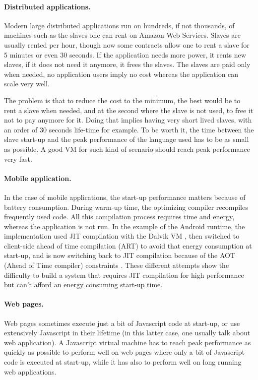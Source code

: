 \documentclass[a4paper,12pt,twoside]{../includes/ThesisStyle}
\begin{document}
\paragraph{Distributed applications.}
Modern large distributed applications run on hundreds, if not thousands, of machines such as the slaves one can rent on Amazon Web Services. Slaves are usually rented per hour, though now some contracts allow one to rent a slave for 5 minutes or even 30 seconds. If the application needs more power, it rents new slaves, if it does not need it anymore, it frees the slaves. The slaves are paid only when needed, no application users imply no cost whereas the application can scale very well.

The problem is that to reduce the cost to the minimum, the best would be to rent a slave when needed, and at the second where the slave is not used, to free it not to pay anymore for it. Doing that implies having very short lived slaves, with an order of 30 seconds life-time for example. To be worth it, the time between the slave start-up and the peak performance of the language used has to be as small as possible. A good VM for such kind of scenario should reach peak performance very fast.

\paragraph{Mobile application.}
In the case of mobile applications, the start-up performance matters because of  battery consumption. During warm-up time, the optimizing compiler recompiles frequently used code. All this compilation process requires time and energy, whereas the application is not run. In the example of the Android runtime, the implementation used JIT compilation with the Dalvik VM \cite{Born08a}, then switched to client-side ahead of time compilation (ART) to avoid that energy consumption at start-up, and is now switching back to JIT compilation because of the AOT (Ahead of Time compiler) constraints \cite{Geof15a}. These different attempts show the difficulty to build a system that requires JIT compilation for high performance but can't afford an energy consuming start-up time.

\paragraph{Web pages.}
Web pages sometimes execute just a bit of Javascript code at start-up, or use extensively Javascript in their lifetime (in this latter case, one usually talk about web application). A Javascript virtual machine has to reach peak performance as quickly as possible to perform well on web pages where only a bit of Javascript code is executed at start-up, while it has also to perform well on long running web applications.
\end{document}

